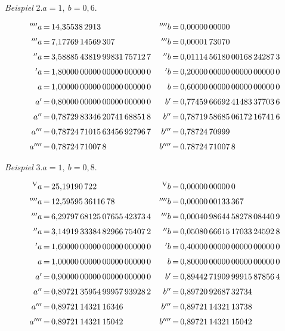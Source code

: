 \begin{center}\textit{Beispiel} 2.\quad $a=1,\ b=0{,}6$.\end{center}
\begingroup\small\setlength{\arraycolsep}{0pt}
\[\begin{array}{r@{\,=\,}l@{\quad}r@{\,=\,}l}
{}^{\prime\prime\prime\prime}a&14{,}35538\,2913&{}^{\prime\prime\prime\prime}b&0{,}00000\,00000\\[6pt]
{}^{\prime\prime\prime}a&7{,}17769\,14569\,307&{}^{\prime\prime\prime}b&0{,}00001\,73070\\[6pt]
{}^{\prime\prime}a&3{,}58885\,43819\,99831\,75712\,7&{}^{\prime\prime}b&0{,}01114\,56180\,00168\,24287\,3\\[6pt]
{}^{\prime}a&1{,}80000\,00000\,00000\,00000\,0&{}^{\prime}b&0{,}20000\,00000\,00000\,00000\,0\\[6pt]
a&1{,}00000\,00000\,00000\,00000\,0&b&0{,}60000\,00000\,00000\,00000\,0\\[6pt]
a'&0{,}80000\,00000\,00000\,00000\,0&b'&0{,}77459\,66692\,41483\,37703\,6\\[6pt]
a''&0{,}78729\,83346\,20741\,68851\,8&b''&0{,}78719\,58685\,06172\,16741\,6\\[6pt]
a'''&0{,}78724\,71015\,63456\,92796\,7&b'''&0{,}78724\,70999\\[6pt]
a''''&0{,}78724\,71007\,8&b''''&0.78724\,71007\,8
\end{array}
\]\endgroup
{}
\begin{center}\textit{Beispiel} 3.\quad $a=1,\ b=0{,}8$.\end{center}
\begingroup\small\setlength{\arraycolsep}{0pt}
\[\begin{array}{r@{\,=\,}l@{\quad}r@{\,=\,}l}
{}^{\mathrm V}a&25{,}19190\,722&{}^{\mathrm V}b&0{,}00000\,00000\,0\\[6pt]
{}^{\prime\prime\prime\prime}a&12{,}59595\,36116\,78&{}^{\prime\prime\prime\prime}b&0{,}00000\,00133\,367\\[6pt]
{}^{\prime\prime\prime}a&6{,}29797\,68125\,07655\,42373\,4&{}^{\prime\prime\prime}b&0{,}00040\,98644\,58278\,08440\,9\\[6pt]
{}^{\prime\prime}a&3{,}14919\,33384\,82966\,75407\,2&{}^{\prime\prime}b&0{,}05080\,66615\,17033\,24592\,8\\[6pt]
{}^{\prime}a&1{,}60000\,00000\,00000\,00000\,0&{}^{\prime}b&0{,}40000\,00000\,00000\,00000\,0\\[6pt]
a&1{,}00000\,00000\,00000\,00000\,0&b&0{,}80000\,00000\,00000\,00000\,0\\[6pt]
a'&0{,}90000\,00000\,00000\,00000\,0&b'&0{,}89442\,71909\,99915\,87856\,4\\[6pt]
a''&0{,}89721\,35954\,99957\,93928\,2&b''&0{,}89720\,92687\,32734\\[6pt]
a'''&0{,}89721\,14321\,16346&b'''&0{,}89721\,14321\,13738\\[6pt]
a''''&0{,}89721\,14321\,15042&b''''&0{,}89721\,14321\,15042
\end{array}
\]\endgroup

